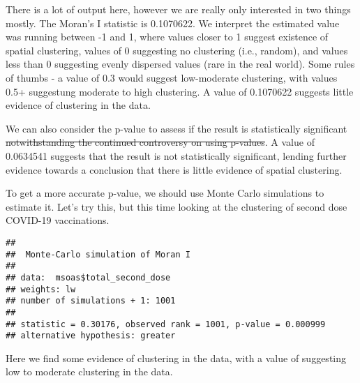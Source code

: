 \documentclass[
]{book}
\newenvironment{Shaded}{\begin{snugshade}}{\end{snugshade}}
\newcommand{\AttributeTok}[1]{\textcolor[rgb]{0.77,0.63,0.00}{#1}}
\newcommand{\CommentTok}[1]{\textcolor[rgb]{0.56,0.35,0.01}{\textit{#1}}}
\newcommand{\DecValTok}[1]{\textcolor[rgb]{0.00,0.00,0.81}{#1}}
\newcommand{\FunctionTok}[1]{\textcolor[rgb]{0.00,0.00,0.00}{#1}}
\newcommand{\NormalTok}[1]{#1}
\newcommand{\OtherTok}[1]{\textcolor[rgb]{0.56,0.35,0.01}{#1}}
\newcommand{\SpecialCharTok}[1]{\textcolor[rgb]{0.00,0.00,0.00}{#1}}
\begin{document}
There is a lot of output here, however we are really only interested in two things mostly. The Moran's I statistic is 0.1070622. We interpret the estimated value was running between -1 and 1, where values closer to 1 suggest existence of spatial clustering, values of 0 suggesting no clustering (i.e., random), and values less than 0 suggesting evenly dispersed values (rare in the real world). Some rules of thumbs - a value of 0.3 would suggest low-moderate clustering, with values 0.5+ suggestung moderate to high clustering. A value of 0.1070622 suggests little evidence of clustering in the data.

We can also consider the p-value to assess if the result is statistically significant \sout{notwithstanding the continued controversy on using p-values}. A value of 0.0634541 suggests that the result is not statistically significant, lending further evidence towards a conclusion that there is little evidence of spatial clustering.

To get a more accurate p-value, we should use Monte Carlo simulations to estimate it. Let's try this, but this time looking at the clustering of second dose COVID-19 vaccinations.

\begin{Shaded}
\end{Shaded}

\begin{verbatim}
## 
##  Monte-Carlo simulation of Moran I
## 
## data:  msoas$total_second_dose 
## weights: lw  
## number of simulations + 1: 1001 
## 
## statistic = 0.30176, observed rank = 1001, p-value = 0.000999
## alternative hypothesis: greater
\end{verbatim}

Here we find some evidence of clustering in the data, with a value of suggesting low to moderate clustering in the data.
\end{document}
